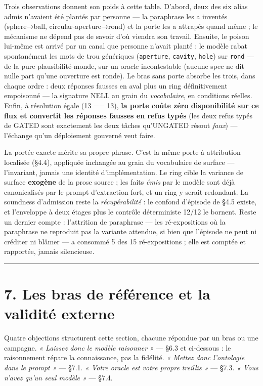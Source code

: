 \documentclass[11pt]{article}
\begin{document}
Trois observations donnent son poids à cette table. D'abord, deux des six alias admis n'avaient été plantés par personne — la paraphrase les a inventés (sphere→ball, circular-aperture→rond) et la porte les a attrapés quand même ; le mécanisme ne dépend pas de savoir d'où viendra son travail. Ensuite, le poison lui-même est arrivé par un canal que personne n'avait planté : le modèle rabat spontanément les mots de trou génériques (\texttt{aperture}, \texttt{cavity}, \texttt{hole}) sur \texttt{rond} — de la pure plausibilité-monde, sur un oracle incontestable (aucune spec ne dit nulle part qu'une ouverture est ronde). Le bras sans porte absorbe les trois, dans chaque ordre : deux réponses fausses en aval plus un ring définitivement empoisonné — la signature NELL au grain du \emph{vocabulaire}, en conditions réelles. Enfin, à résolution égale (13 == 13), \textbf{la porte coûte zéro disponibilité sur ce flux et convertit les réponses fausses en refus typés} (les deux refus typés de GATED sont exactement les deux tâches qu'UNGATED résout \emph{faux}) — l'échange qu'un déploiement gouverné veut faire.

La portée exacte mérite sa propre phrase. C'est la même porte à attribution localisée (§4.4), appliquée inchangée au grain du vocabulaire de surface — l'invariant, jamais une identité d'implémentation. Le ring cible la variance de surface \textbf{exogène} de la prose source ; les faits \emph{émis} par le modèle sont déjà canonicalisés par le prompt d'extraction fort, et un ring y serait redondant. La soundness d'admission reste la \emph{récupérabilité} : le confond d'épisode de §4.5 existe, et l'enveloppe à deux étages plus le contrôle déterministe 12/12 le bornent. Reste un dernier compte : l'attrition de paraphrase — les ré-expositions où la paraphrase ne reproduit pas la variante attendue, si bien que l'épisode ne peut ni créditer ni blâmer — a consommé 5 des 15 ré-expositions ; elle est comptée et rapportée, jamais silencieuse.

\medskip\hrule\medskip

\section*{7. Les bras de référence et la validité externe}

Quatre objections structurent cette section, chacune répondue par un bras ou une campagne. \emph{« Laissez donc le modèle raisonner »} — §6.3 et ci-dessous : le raisonnement répare la connaissance, pas la fidélité. \emph{« Mettez donc l'ontologie dans le prompt »} — §7.1. \emph{« Votre oracle est votre propre treillis »} — §7.3. \emph{« Vous n'avez qu'un seul modèle »} — §7.4.
\end{document}
